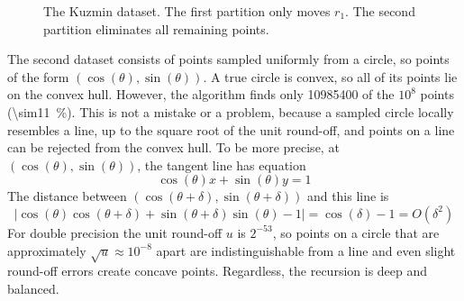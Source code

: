 \documentclass[11pt,a4paper]{article}
\begin{document}
\begin{figure}[ht]
  \centering
  \caption{The Kuzmin dataset.
  The first partition only moves $r_1$.
  The second partition eliminates all remaining points.}%
  \label{fig:kuzmin}%
\end{figure}

The second dataset consists of points sampled uniformly from a circle, so points of the form $(\cos(\theta), \sin(\theta))$.
A true circle is convex, so all of its points lie on the convex hull.
However, the algorithm finds only \num{10985400} of the $10^8$ points (\qty{\sim11}{\percent}).
This is not a mistake or a problem, because a sampled circle locally resembles a line, up to the square root of the unit round-off, and points on a line can be rejected from the convex hull.
To be more precise, at $(\cos(\theta), \sin(\theta))$, the tangent line has equation
\[
\cos(\theta) x + \sin(\theta) y = 1
\]
The distance between $(\cos(\theta + \delta), \sin(\theta + \delta))$ and this line is
\[
|\cos(\theta)\cos(\theta + \delta) + \sin(\theta + \delta)\sin(\theta) - 1| = \cos(\delta) - 1 = O(\delta^2)
\]
For double precision the unit round-off $u$ is $2^{-53}$, so points on a circle that are approximately $\sqrt{u} \approx 10^{-8}$ apart are indistinguishable from a line and even slight round-off errors create concave points.
Regardless, the recursion is deep and balanced.
\end{document}
